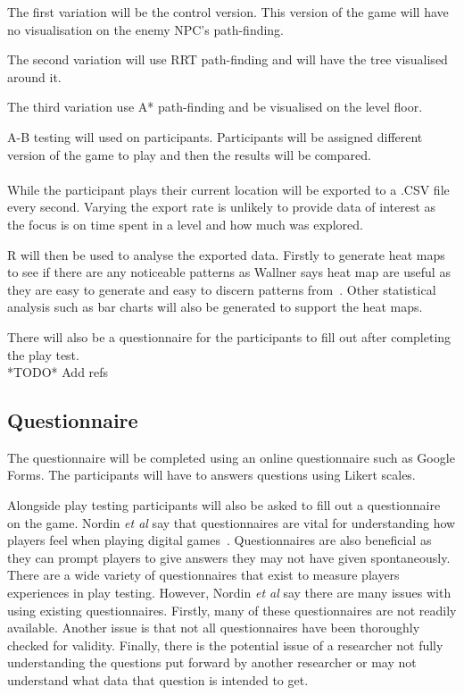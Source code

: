 \documentclass[journal]{IEEEtran}
\begin{document}
The first variation will be the control version. This version of the game will have no visualisation on the enemy NPC's path-finding.

The second variation will use RRT path-finding and will have the tree visualised around it. 

The third variation use A* path-finding and be visualised on the level floor. 

A-B testing will used on participants. Participants will be assigned different version of the game to play and then the results will be compared. \\
\\
While the participant plays their current location will be exported to a .CSV file every second. Varying the export rate is unlikely to provide data of interest as the focus is on time spent in a level and how much was explored. 

R will then be used to analyse the exported data. Firstly to generate heat maps to see if there are any noticeable patterns as Wallner says heat map are useful as they are easy to generate and easy to discern patterns from~\cite{Wallner2015}. 
Other statistical analysis such as  bar charts will also be generated to support the heat maps.
 
There will also be a questionnaire for the participants to fill out after completing the play test.\\

*TODO* Add refs

\subsection{Questionnaire}
The questionnaire will be completed using an online questionnaire such as Google Forms. The participants will have to answers questions using Likert scales.

Alongside play testing participants will also be asked to fill out a questionnaire on the game. Nordin \textit{et al} say that questionnaires are vital for understanding how players feel when playing digital games~\cite{nordin2014}. Questionnaires are also beneficial as they can prompt players to give answers they may not have given spontaneously. There are a wide variety of questionnaires that exist to measure players experiences in play testing. However, Nordin \textit{et al} say there are many issues with using existing questionnaires. Firstly, many of these questionnaires are not readily available. Another issue is that not all questionnaires have been thoroughly checked for validity. Finally, there is the potential issue of a researcher not fully understanding the questions put forward by another researcher or may not understand what data that question is intended to get.
  
\end{document}
